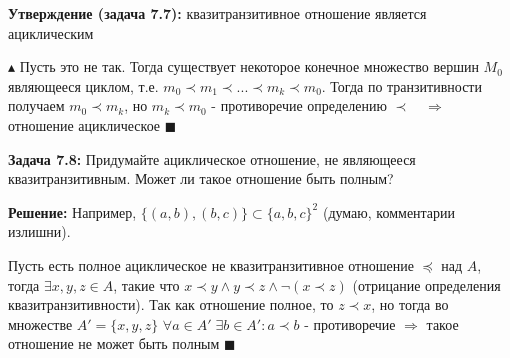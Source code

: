 \par \textbf{Утверждение (задача 7.7):} квазитранзитивное отношение является ациклическим
\par $\blacktriangle$ Пусть это не так. Тогда существует некоторое конечное множество вершин $M_0$ являющееся циклом, т.е. $m_0 \prec m_1 \prec ... \prec m_k \prec m_0$. Тогда по транзитивности получаем $m_0 \prec m_k$, но $m_k \prec m_0$ - противоречие определению $\prec \quad \Rightarrow$ отношение ациклическое $\blacksquare$ 
\par \textbf{Задача 7.8:} Придумайте ациклическое отношение, не являющееся квазитранзитивным. Может ли такое отношение быть полным?
\par \textbf{Решение:} Например, $\{(a, b), (b, c)\}\subset\{a, b, c\}^2$ (думаю, комментарии излишни). 
\par Пусть есть полное ациклическое не квазитранзитивное отношение $\preccurlyeq$ над $A$, тогда $\exists x, y, z\in A$, такие что $x\prec y \wedge y\prec z \wedge \neg (x\prec z)$ (отрицание определения квазитранзитивности). Так как отношение полное, то $z\prec x$, но тогда во множестве $A' = \{x, y, z\}$ $\forall a\in A'\; \exists b\in A': a\prec b$ - противоречие $\Rightarrow$ такое отношение не может быть полным
 $\blacksquare$\\